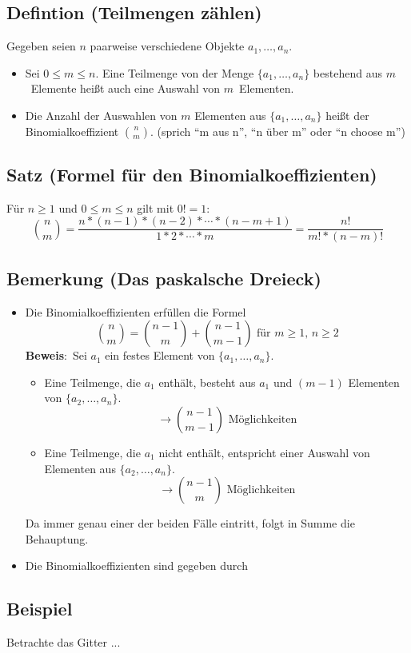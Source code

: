 \subsection{Defintion (Teilmengen zählen)}
Gegeben seien $n$ paarweise verschiedene Objekte $a_1,\ldots,a_n$.
\begin{itemize}
\item Sei $0 \leq m \leq n$. Eine Teilmenge von der Menge $\{a_1,\ldots,a_n\}$ bestehend aus $m$ Elemente heißt auch eine Auswahl von $m$ Elementen.
\item Die Anzahl der Auswahlen von $m$ Elementen aus $\{a_1,\ldots,a_n\}$ heißt der Binomialkoeffizient $\binom{n}{m}$.
	(sprich ``m aus n'', ``n über m'' oder ``n choose m'')
\end{itemize}

\subsection{Satz (Formel für den Binomialkoeffizienten)}
Für $n \geq 1$ und $0 \leq m \leq n$ gilt mit $0!=1$:
\[ \binom{n}{m} = \frac{n*(n-1)*(n-2)*\cdots*(n-m+1)}{1*2*\cdots*m} = \frac{n!}{m!*(n-m)!} \]

\subsection{Bemerkung (Das paskalsche Dreieck)}
\begin{itemize}
\item Die Binomialkoeffizienten erfüllen die Formel
	\[ \binom{n}{m} = \binom{n-1}{m} + \binom{n-1}{m-1} \text{ f\"ur } m\geq1,\,n\geq2 \]
	\textbf{Beweis}: Sei $a_1$ ein festes Element von $\{a_1,\ldots,a_n\}$.
	\begin{itemize}
	\item Eine Teilmenge, die $a_1$ enthält, besteht aus $a_1$ und $(m-1)$ Elementen von $\{a_2,\ldots,a_n\}$.
		\[\rightarrow \binom{n-1}{m-1} \text{ M\"oglichkeiten}\]
	\item Eine Teilmenge, die $a_1$ nicht enthält, entspricht einer Auswahl von Elementen aus $\{a_2,\ldots,a_n\}$.
		\[\rightarrow \binom{n-1}{m} \text{ M\"oglichkeiten}\]
	\end{itemize}
	Da immer genau einer der beiden Fälle eintritt, folgt in Summe die Behauptung.
\item Die Binomialkoeffizienten sind gegeben durch 
\end{itemize}

\subsection{Beispiel}
Betrachte das Gitter ...

